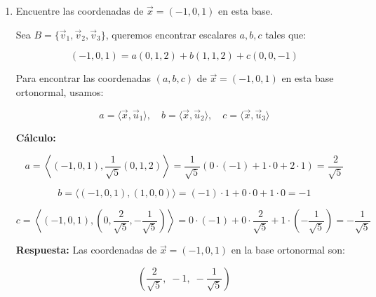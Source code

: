 \documentclass[a4paper]{article}
\begin{document}
\begin{enumerate}
\begin{enumerate}
\[
\text{proy}_{\vec{u}_2}(\vec{v}_3) = \langle \vec{v}_3, \vec{u}_2 \rangle \vec{u}_2 = (0)(1)+(0)(0)+(-1)(0) = 0
\Rightarrow \text{proyección total} = (0,-\frac{2}{5},-\frac{4}{5})
\]

\[
\vec{u}_3 = \vec{v}_3 - \text{proy} = (0,0,-1) - (0,-\frac{2}{5},-\frac{4}{5}) = (0,\frac{2}{5},-\frac{1}{5})
\]

\[
\|\vec{u}_3\| = \sqrt{\left(\frac{2}{5}\right)^2 + \left(-\frac{1}{5}\right)^2} = \sqrt{\frac{4}{25} + \frac{1}{25}} = \sqrt{\frac{5}{25}} = \frac{1}{\sqrt{5}}
\Rightarrow \vec{e}_3 = \sqrt{5} \cdot (0,\frac{2}{5},-\frac{1}{5}) = (0,\frac{2}{\sqrt{5}}, -\frac{1}{\sqrt{5}})
\]

\textbf{Resultado:} La base ortonormal es:
\[
\left\{
\frac{1}{\sqrt{5}}(0,1,2),\;
(1,0,0),\;
\frac{1}{\sqrt{5}}(0,2,-1)\right)
\right\}
\]

\vspace{0.4cm}

\item Encuentre las coordenadas de \( \vec{x} = (-1, 0, 1) \) en esta base.

Sea \( B = \{\vec{v}_1, \vec{v}_2, \vec{v}_3\} \), queremos encontrar escalares \( a, b, c \) tales que:

\[
(-1,0,1) = a(0,1,2) + b(1,1,2) + c(0,0,-1)
\]

Para encontrar las coordenadas \( (a, b, c) \) de \( \vec{x} = (-1,0,1) \) en esta base ortonormal, usamos:

\[
a = \langle \vec{x}, \vec{u}_1 \rangle, \quad
b = \langle \vec{x}, \vec{u}_2 \rangle, \quad
c = \langle \vec{x}, \vec{u}_3 \rangle
\]

\textbf{Cálculo:}

\[
a = \left\langle (-1, 0, 1), \frac{1}{\sqrt{5}}(0,1,2) \right\rangle
= \frac{1}{\sqrt{5}} \left( 0\cdot(-1) + 1\cdot0 + 2\cdot1 \right) = \frac{2}{\sqrt{5}}
\]

\[
b = \langle (-1, 0, 1), (1,0,0) \rangle = (-1)\cdot1 + 0\cdot0 + 1\cdot0 = -1
\]

\[
c = \left\langle (-1, 0, 1), \left(0, \frac{2}{\sqrt{5}}, -\frac{1}{\sqrt{5}}\right) \right\rangle
= 0\cdot(-1) + 0\cdot\frac{2}{\sqrt{5}} + 1\cdot\left(-\frac{1}{\sqrt{5}}\right) = -\frac{1}{\sqrt{5}}
\]

\textbf{Respuesta:}  
Las coordenadas de \( \vec{x} = (-1,0,1) \) en la base ortonormal son:

\[
\left( \frac{2}{\sqrt{5}},\; -1,\; -\frac{1}{\sqrt{5}} \right)
\]
\end{enumerate}


\end{enumerate}
\end{document}
